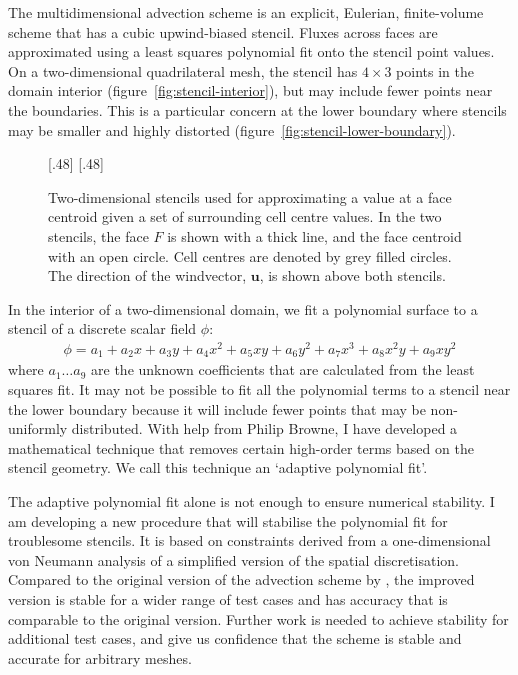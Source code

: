 \documentclass[a4paper,11pt]{article}
\begin{document}
The multidimensional advection scheme is an explicit, Eulerian, finite-volume scheme that has a cubic upwind-biased stencil.  Fluxes across faces are approximated using a least squares polynomial fit onto the stencil point values.
On a two-dimensional quadrilateral mesh, the stencil has $4 \times 3$ points in the domain interior (figure~\ref{fig:stencil-interior}), but may include fewer points near the boundaries.  This is a particular concern at the lower boundary where stencils may be smaller and highly distorted (figure~\ref{fig:stencil-lower-boundary}).

\begin{figure}
	\centering
	[.48\linewidth]{}
	[.48\linewidth]{\vspace*{2em}}
	\caption{Two-dimensional stencils used for approximating a value at a face centroid given a set of surrounding cell centre values.  In the two stencils, the face $F$ is shown with a thick line, and the face centroid with an open circle. Cell centres are denoted by grey filled circles.  The direction of the windvector, $\bm{u}$, is shown above both stencils.}
	\label{fig:stencils}
\end{figure}

In the interior of a two-dimensional domain, we fit a polynomial surface to a stencil of a discrete scalar field $\phi$:
\begin{align}
	\phi = a_1 + a_2 x + a_3 y + a_4 x^2 + a_5 x y + a_6 y^2 + a_7 x^3 + a_8 x^2 y + a_9 x y^2
\end{align}
where $a_1 \ldots a_9$ are the unknown coefficients that are calculated from the least squares fit.  It may not be possible to fit all the polynomial terms to a stencil near the lower boundary because it will include fewer points that may be non-uniformly distributed.  With help from Philip Browne, I have developed a mathematical technique that removes certain high-order terms based on the stencil geometry.  We call this technique an `adaptive polynomial fit'.

The adaptive polynomial fit alone is not enough to ensure numerical stability.  I am developing a new procedure that will stabilise the polynomial fit for troublesome stencils.  It is based on constraints derived from a one-dimensional von Neumann analysis of a simplified version of the spatial discretisation.  Compared to the original version of the advection scheme by \citet{weller-shahrokhi2014}, the improved version is stable for a wider range of test cases and has accuracy that is comparable to the original version.  Further work is needed to achieve stability for additional test cases, and give us confidence that the scheme is stable and accurate for arbitrary meshes.
\end{document}
